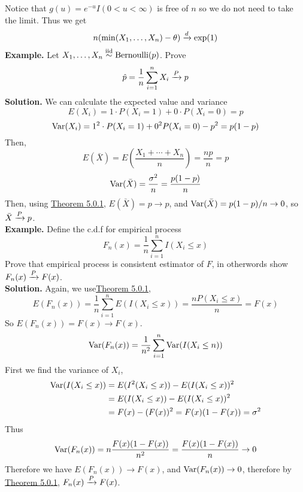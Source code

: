 \documentclass[openany]{report}
\begin{document}
Notice that $g(u) = e^{-u}I(0 < u < \infty)$ is free of $n$ so we do not need to take the limit. Thus we get 
\[n(\min(X_1,\ldots,X_n) - \theta) \xrightarrow{d} \exp(1)\]
\textbf{Example.} Let $X_1,\ldots, X_n \overset{\mathrm{iid}}{\sim} \operatorname{Bernoulli}(p)$. Prove 
\[\hat{p} = \frac{1}{n}\sum_{i=1}^nX_i \xrightarrow{P} p\]
\textbf{Solution.} We can calculate the expected value and variance 
\[E(X_i) = 1 \cdot P(X_i = 1) + 0 \cdot P(X_i=  0) = p \]
\[\operatorname{Var}(X_i) = 1^2\cdot P(X_i = 1) + 0^2 P(X_i = 0) - p^2 = p(1-p)\]
Then, 
\[E(\bar{X}) = E\left(\frac{X_1 + \cdots + X_n}{n}\right) = \frac{np}{n} = p\]
\[\operatorname{Var}(\bar{X}) = \frac{\sigma^2}{n} = \frac{p(1-p)}{n}\]
Then, using \hyperref[theorem:5.0.1]{Theorem 5.0.1}, $E(\bar{X}) = p \rightarrow p$, and $\operatorname{Var}(\bar{X}) = p(1-p)/n \rightarrow 0$, so $\bar{X}\xrightarrow{P} p$.\\[2ex]
\textbf{Example.} Define the c.d.f for empirical process 
\[F_n(x) = \frac{1}{n}\sum_{i=1}^nI(X_i \leq x)\]
Prove that empirical process is consistent estimator of $F$, in otherwords show $F_n(x) \xrightarrow{P} F(x)$.\\[2ex]
\textbf{Solution.} Again, we use\hyperref[theorem:5.0.1]{Theorem 5.0.1},
\[E(F_n(x)) = \frac{1}{n}\sum_{i=1}^n E(I(X_i\leq x)) = \frac{nP(X_i\leq x)}{n} = F(x)\]
So $E(F_n(x)) = F(x) \rightarrow F(x)$. 
\[\operatorname{Var}(F_n(x)) = \frac{1}{n^2}\sum_{i=1}^n \operatorname{Var}(I(X_i \leq n))\]
First we find the variance of $X_i$, 
\begin{align*}
    \operatorname{Var}(I(X_i \leq x)) &= E(I^2(X_i \leq x)) - E(I(X_i \leq x))^2\\
    &= E(I(X_i \leq x)) - E(I(X_i \leq x))^2\\
    &= F(x) - (F(x))^2 = F(x)(1 - F(x)) = \sigma^2
\end{align*}
Thus 
\[\operatorname{Var}(F_n(x)) = n\frac{F(x)(1-F(x))}{n^2} = \frac{F(x)(1-F(x))}{n} \rightarrow 0\]
Therefore we have $E(F_n(x)) \rightarrow F(x)$, and $\operatorname{Var}(F_n(x)) \rightarrow 0$, therefore by  \hyperref[theorem:5.0.1]{Theorem 5.0.1}, $F_n(x) \xrightarrow{P} F(x)$.
\end{document}
